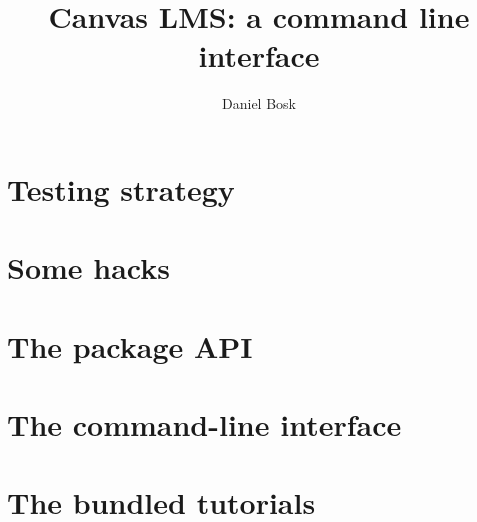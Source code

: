 \documentclass[a4paper,oneside]{memoir}
\title{%
  Canvas LMS: a command line interface
}
\author{%
  Daniel Bosk
}
\affil{%
  KTH EECS
}
\begin{document}
\frontmatter
\maketitle

\vspace*{\fill}

\clearpage

\clearpage


\tableofcontents
\clearpage

\mainmatter






\part{Testing strategy}




\part{Some hacks}




\part{The package API}



\part{The command-line interface}























\part{The bundled tutorials}







\printbibliography
\end{document}

